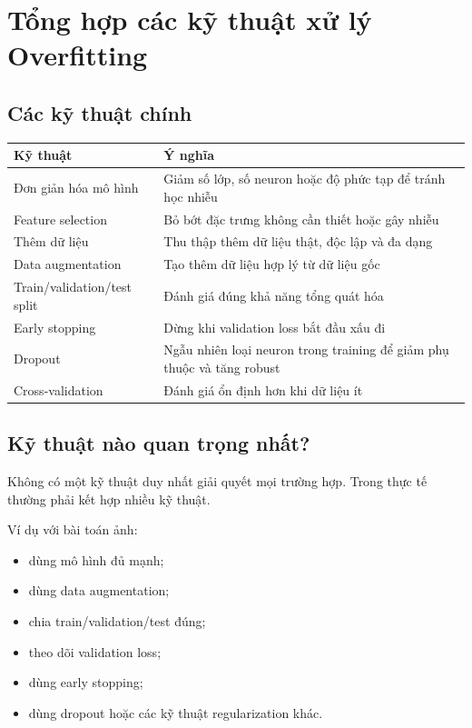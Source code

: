 \documentclass[12pt,a4paper]{report}
\begin{document}
\chapter{Tổng hợp các kỹ thuật xử lý Overfitting}

\section{Các kỹ thuật chính}

\begin{center}
\begin{tabular}{p{}p{}}
\toprule
Kỹ thuật & Ý nghĩa \\
\midrule
Đơn giản hóa mô hình & Giảm số lớp, số neuron hoặc độ phức tạp để tránh học nhiễu \\
Feature selection & Bỏ bớt đặc trưng không cần thiết hoặc gây nhiễu \\
Thêm dữ liệu & Thu thập thêm dữ liệu thật, độc lập và đa dạng \\
Data augmentation & Tạo thêm dữ liệu hợp lý từ dữ liệu gốc \\
Train/validation/test split & Đánh giá đúng khả năng tổng quát hóa \\
Early stopping & Dừng khi validation loss bắt đầu xấu đi \\
Dropout & Ngẫu nhiên loại neuron trong training để giảm phụ thuộc và tăng robust \\
Cross-validation & Đánh giá ổn định hơn khi dữ liệu ít \\
\bottomrule
\end{tabular}
\end{center}

\section{Kỹ thuật nào quan trọng nhất?}

Không có một kỹ thuật duy nhất giải quyết mọi trường hợp. Trong thực tế thường phải kết hợp nhiều kỹ thuật.

Ví dụ với bài toán ảnh:

\begin{itemize}
    \item dùng mô hình đủ mạnh;
    \item dùng data augmentation;
    \item chia train/validation/test đúng;
    \item theo dõi validation loss;
    \item dùng early stopping;
    \item dùng dropout hoặc các kỹ thuật regularization khác.
\end{itemize}
\end{document}
